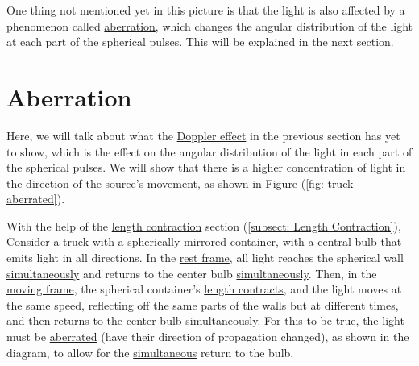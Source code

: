 One thing not mentioned yet in this picture is that the light is also affected by a phenomenon called \hyperlink{def-aberration}{aberration}, which changes the angular distribution of the light at each part of the spherical pulses.
This will be explained in the next section.

\section{Aberration} \label{sect: Aberration}

Here, we will talk about what the \hyperlink{def-doppler-effect}{Doppler effect} in the previous section has yet to show, which is the effect on the angular distribution of the light in each part of the spherical pulses.
We will show that there is a higher concentration of light in the direction of the source's movement, as shown in Figure (\ref{fig: truck aberrated}).

With the help of the \hyperlink{def-length-contraction}{length contraction} section (\ref{subsect: Length Contraction}), Consider a truck with a spherically mirrored container, with a central bulb that emits light in all directions.
In the \hyperlink{def-proper-frame}{rest frame}, all light reaches the spherical wall \hyperlink{def-simultaneity}{simultaneously} and returns to the center bulb \hyperlink{def-simultaneity}{simultaneously}.
Then, in the \hyperlink{def-Moving-Frame}{moving frame}, the spherical container's \hyperlink{def-length-contraction}{length contracts}, and the light moves at the same speed, reflecting off the same parts of the walls but at different times, and then returns to the center bulb \hyperlink{def-simultaneity}{simultaneously}.
For this to be true, the light must be \hyperlink{def-aberration}{aberrated} (have their direction of propagation changed), as shown in the diagram, to allow for the \hyperlink{def-simultaneity}{simultaneous} return to the bulb.

